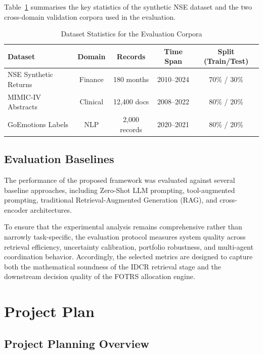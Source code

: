 \documentclass[12pt,a4paper,oneside]{report}
\theoremstyle{definition}
\theoremstyle{remark}
\begin{document}
\vspace{0.5em}
\noindent Table~\ref{tab:dataset_stats} summarises the key statistics of the synthetic NSE dataset and the two cross-domain validation corpora used in the evaluation.

\begin{table}[h!]
\centering
\renewcommand{\arraystretch}{1.4}
\caption{Dataset Statistics for the Evaluation Corpora}
\label{tab:dataset_stats}
\begin{tabular}{|l|c|c|c|c|}
\hline
\textbf{Dataset} & \textbf{Domain} & \textbf{Records} & \textbf{Time Span} & \textbf{Split (Train/Test)} \\
\hline
NSE Synthetic Returns & Finance & 180 months & 2010--2024 & 70\% / 30\% \\ \hline
MIMIC-IV Abstracts & Clinical & 12{,}400 docs & 2008--2022 & 80\% / 20\% \\ \hline
GoEmotions Labels & NLP & 2{,}000 records & 2020--2021 & 80\% / 20\% \\ \hline
\end{tabular}
\end{table}

\section{Evaluation Baselines}

The performance of the proposed framework was evaluated against several baseline approaches, including Zero-Shot LLM prompting, tool-augmented prompting, traditional Retrieval-Augmented Generation (RAG), and cross-encoder architectures.

To ensure that the experimental analysis remains comprehensive rather than narrowly task-specific, the evaluation protocol measures system quality across retrieval efficiency, uncertainty calibration, portfolio robustness, and multi-agent coordination behavior. Accordingly, the selected metrics are designed to capture both the mathematical soundness of the IDCR retrieval stage and the downstream decision quality of the FOTRS allocation engine.


\chapter{Project Plan}

\section{Project Planning Overview}
\end{document}
